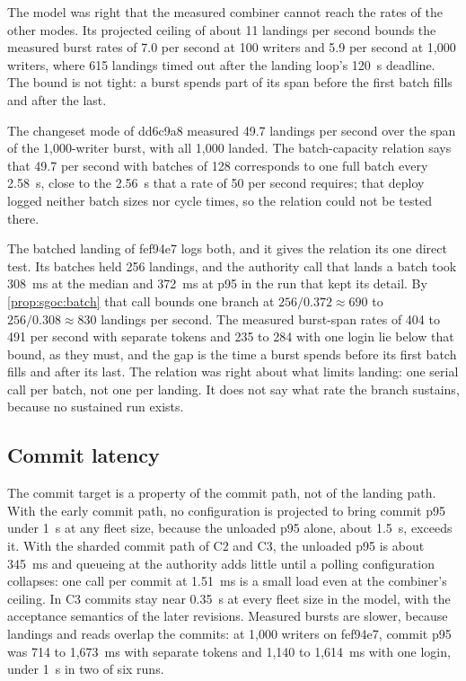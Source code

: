 \documentclass[11pt,letterpaper]{article}
\theoremstyle{definition}
\theoremstyle{remark}
\begin{document}
The model was right that the measured combiner cannot reach the rates of the other modes. Its projected ceiling of about 11 landings per second bounds the measured burst rates of 7.0 per second at 100 writers and 5.9 per second at 1,000 writers, where 615 landings timed out after the landing loop's 120~s deadline. %
The bound is not tight: a burst spends part of its span before the first batch fills and after the last.

The changeset mode of dd6c9a8 measured 49.7 landings per second over the span of the 1,000-writer burst, with all 1,000 landed. %
The batch-capacity relation says that 49.7 per second with batches of 128 corresponds to one full batch every 2.58~s, close to the 2.56~s that a rate of 50 per second requires; that deploy logged neither batch sizes nor cycle times, so the relation could not be tested there.

The batched landing of fef94e7 logs both, and it gives the relation its one direct test. Its batches held 256 landings, and the authority call that lands a batch took 308~ms at the median and 372~ms at p95 in the run that kept its detail. %
By \cref{prop:sgoc:batch} that call bounds one branch at $256/0.372 \approx 690$ to $256/0.308 \approx 830$ landings per second. The measured burst-span rates of 404 to 491 per second with separate tokens and 235 to 284 with one login lie below that bound, as they must, and the gap is the time a burst spends before its first batch fills and after its last. %
The relation was right about what limits landing: one serial call per batch, not one per landing. It does not say what rate the branch sustains, because no sustained run exists.

\subsection{Commit latency}

The commit target is a property of the commit path, not of the landing path. With the early commit path, no configuration is projected to bring commit p95 under 1~s at any fleet size, because the unloaded p95 alone, about 1.5~s, exceeds it. %
With the sharded commit path of C2 and C3, the unloaded p95 is about 345~ms and queueing at the authority adds little until a polling configuration collapses: one call per commit at 1.51~ms is a small load even at the combiner's ceiling. %
In C3 commits stay near 0.35~s at every fleet size in the model, with the acceptance semantics of the later revisions. Measured bursts are slower, because landings and reads overlap the commits: at 1,000 writers on fef94e7, commit p95 was 714 to 1,673~ms with separate tokens and 1,140 to 1,614~ms with one login, under 1~s in two of six runs. %
\end{document}
